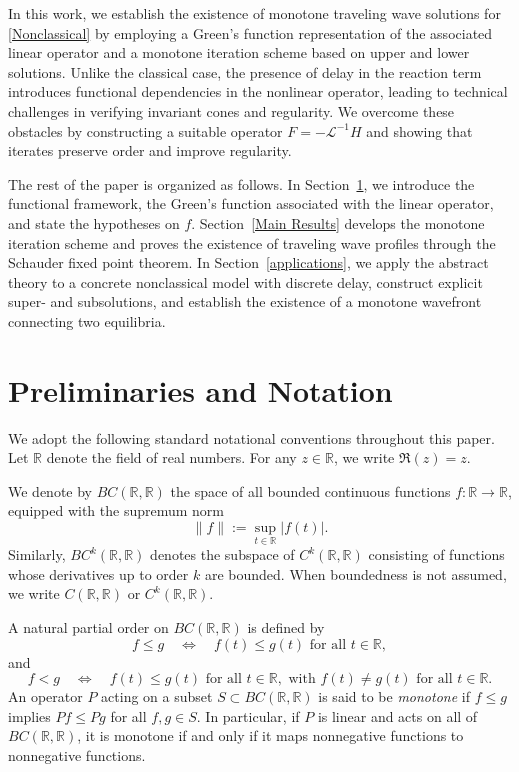\documentclass[12pt,letterpaper]{amsart}
\theoremstyle{definition}
\theoremstyle{remark}
\numberwithin{equation}{section}
\begin{document}
 In this work, we establish the existence of monotone traveling wave solutions 
 for \eqref{Nonclassical} by employing a Green's function representation of 
 the associated linear operator and a monotone iteration scheme based on upper 
 and lower solutions. Unlike the classical case, the presence of delay in the 
 reaction term introduces functional dependencies in the nonlinear operator, 
 leading to technical challenges in verifying invariant cones and regularity.
 We overcome these obstacles by constructing a suitable operator $F=-\mathcal{L}^{-1}H$ 
 and showing that iterates preserve order and improve regularity.
 
 The rest of the paper is organized as follows. In Section~\ref{Preliminaries and Notation}, 
 we introduce the functional framework, the Green’s function associated with the linear 
 operator, and state the hypotheses on $f$. Section~\ref{Main Results} develops the 
 monotone iteration scheme and proves the existence of traveling wave profiles 
 through the Schauder fixed point theorem. In Section~\ref{applications}, 
 we apply the abstract theory to a concrete nonclassical model with discrete delay, 
 construct explicit super- and subsolutions, and establish the existence of a 
 monotone wavefront connecting two equilibria.



 
 \medskip
 

\section{Preliminaries and Notation}\label{Preliminaries and Notation}
We adopt the following standard notational conventions throughout this paper. Let $ \mathbb{R} $ denote the field of real numbers. For any $ z \in \mathbb{R} $, we write $ \Re(z) = z $.




We denote by $ BC(\mathbb{R}, \mathbb{R}) $ the space of all bounded continuous functions $ f \colon \mathbb{R} \to \mathbb{R} $, equipped with the supremum norm
$$
\| f \| := \sup_{t \in \mathbb{R}} | f(t) |.
$$
Similarly, $ BC^k(\mathbb{R}, \mathbb{R}) $ denotes the subspace of $ C^k(\mathbb{R}, \mathbb{R}) $ consisting of functions whose derivatives up to order $ k $ are bounded. When boundedness is not assumed, we write $ C(\mathbb{R}, \mathbb{R}) $ or $ C^k(\mathbb{R}, \mathbb{R}) $.




A natural partial order on $ BC(\mathbb{R}, \mathbb{R}) $ is defined by
$$
f \le g \quad \Longleftrightarrow \quad f(t) \le g(t) \text{ for all } t \in \mathbb{R},
$$
and
$$
f < g \quad \Longleftrightarrow \quad f(t) \le g(t) \text{ for all } t \in \mathbb{R}, \text{ with } f(t) \ne g(t) \text{ for all } t \in \mathbb{R}.
$$
An operator $ P $ acting on a subset $ S \subset BC(\mathbb{R}, \mathbb{R}) $ is said to be \emph{monotone} if $ f \le g $ implies $ Pf \le Pg $ for all $ f, g \in S $. In particular, if $ P $ is linear and acts on all of $ BC(\mathbb{R}, \mathbb{R}) $, it is monotone if and only if it maps nonnegative functions to nonnegative functions.
\end{document}
